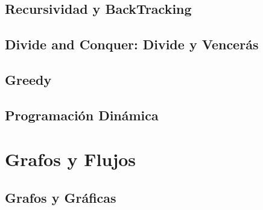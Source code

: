 \documentclass[12pt, fleqn]{report}                             %
\theoremstyle{break}                                            %
\begin{document}
    \chapter{Recursividad y BackTracking}

    \clearpage
    \chapter{Divide and Conquer: Divide y Vencerás}


    \clearpage
    \chapter{Greedy}

    \clearpage
    \chapter{Programación Dinámica}


\part{Grafos y Flujos}

    \chapter{Grafos y Gráficas}    
\end{document}
